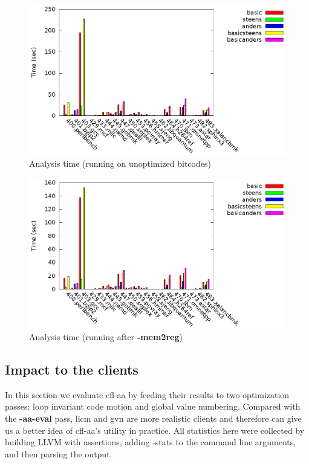 \documentclass[10pt]{article}
\begin{document}
\begin{figure}
  \centering
  \includegraphics[width=\linewidth]{result/time/timeO0.eps}
  \caption{Analysis time (running on unoptimized bitcodes)\label{fig:aliasTime_O0}}
\end{figure}

\begin{figure}
  \centering
  \includegraphics[width=\linewidth]{result/time/timeMem2reg.eps}
  \caption{Analysis time (running after \textbf{-mem2reg})\label{fig:aliasTime_Mem2reg}}
\end{figure}

\subsection{Impact to the clients}

In this section we evaluate cfl-aa by feeding their results to two optimization passes: loop invariant code motion
and global value numbering. Compared with the \textbf{-aa-eval} pass, licm and
gvn are more realistic clients and therefore can give us a better idea of
cfl-aa's utility in practice. All statistics here were collected by building LLVM with assertions, adding
-stats to the command line arguments, and then parsing the output. 
\end{document}
